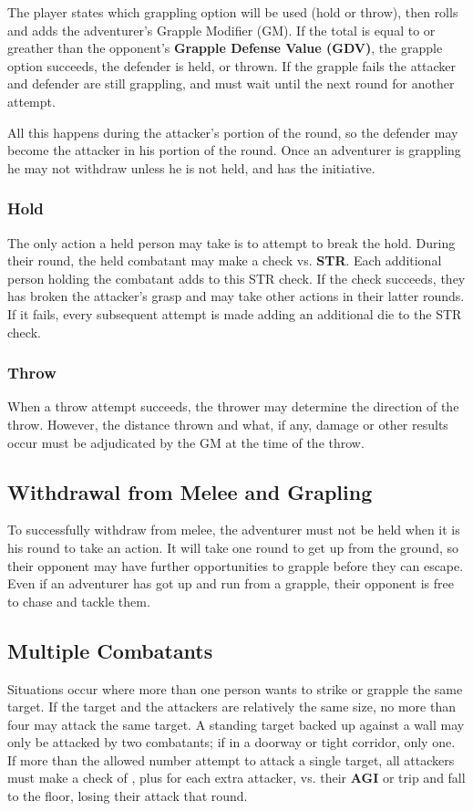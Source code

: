 \begin{multicols*}{2}
The player states which grappling option will be used (hold or throw), then rolls  and adds the adventurer's Grapple Modifier (GM). If the total is equal to or greather than the opponent's \textbf{Grapple Defense Value (GDV)}, the grapple option succeeds, the defender is held, or thrown. If the grapple fails the attacker and defender are still grappling, and must wait until the next round for another attempt.

All this happens during the attacker's portion of the round, so the defender may become the attacker in his portion of the round. Once an adventurer is grappling he may not withdraw unless he is not held, and has the initiative.
\subsubsection{Hold}
The only action a held person may take is to attempt to break the hold. During their round, the held combatant may make a  check vs. \textbf{STR}. Each additional person holding the combatant adds  to this STR check. If the check succeeds, they has broken the attacker’s grasp and may take other actions in their latter rounds. If it fails, every subsequent attempt is made adding an additional die to the STR check.
\subsubsection{Throw}
When a throw attempt succeeds, the thrower may determine the direction of the throw. However, the distance thrown and what, if any, damage or other results occur must be adjudicated by the GM at the time of the throw.
\subsection{Withdrawal from Melee and Grapling}
To successfully withdraw from melee, the adventurer must not be held when it is his round to take an action. It will take one round to get up from the ground, so their opponent may have further opportunities to grapple before they can escape. Even if an adventurer has got up and run from a grapple, their opponent is free to chase and tackle them.
\subsection{Multiple Combatants}
Situations occur where more than one person wants to strike or grapple the same target. If the target and the attackers are relatively the same size, no more than four may attack the same target. A standing target backed up against a wall may only be attacked by two combatants; if in a doorway or tight corridor, only one. If more than the allowed number attempt to attack a single target, all attackers must make a check of , plus  for each extra attacker, vs. their \textbf{AGI} or trip and fall to the floor, losing their attack that round.


\end{multicols*}
